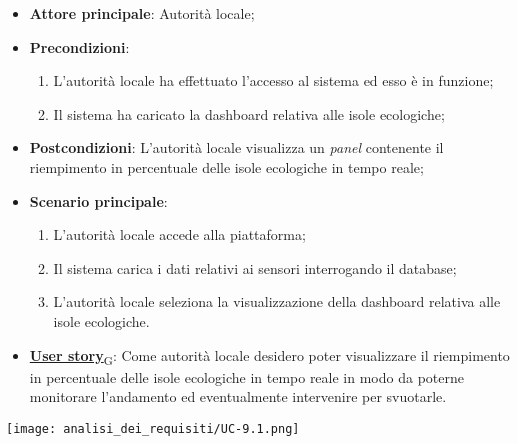 \begin{itemize}
	\item \textbf{Attore principale}: Autorità locale;
	\item \textbf{Precondizioni}:
	      \begin{enumerate}
		      \item L'autorità locale ha effettuato l'accesso al sistema ed esso è in funzione;
		      \item Il sistema ha caricato la dashboard relativa alle isole ecologiche;
	      \end{enumerate}
	\item \textbf{Postcondizioni}: L'autorità locale visualizza un \textit{panel} contenente il riempimento in percentuale delle isole ecologiche in tempo reale;
	\item \textbf{Scenario principale}:
	      \begin{enumerate}
		      \item L'autorità locale accede alla piattaforma;
		      \item Il sistema carica i dati relativi ai sensori interrogando il database;
		      \item L'autorità locale seleziona la visualizzazione della dashboard relativa alle isole ecologiche.
	      \end{enumerate}
	\item \href{https://7last.github.io/docs/rtb/documentazione-interna/glossario\#user-story}{\textbf{User story}\textsubscript{G}}:
	      Come autorità locale desidero poter visualizzare il riempimento in percentuale delle isole ecologiche in tempo reale in modo da poterne monitorare l'andamento
	      ed eventualmente intervenire per svuotarle.
\end{itemize}
\begin{center}
	\texttt{[image: analisi\_dei\_requisiti/UC-9.1.png]}
\end{center}

